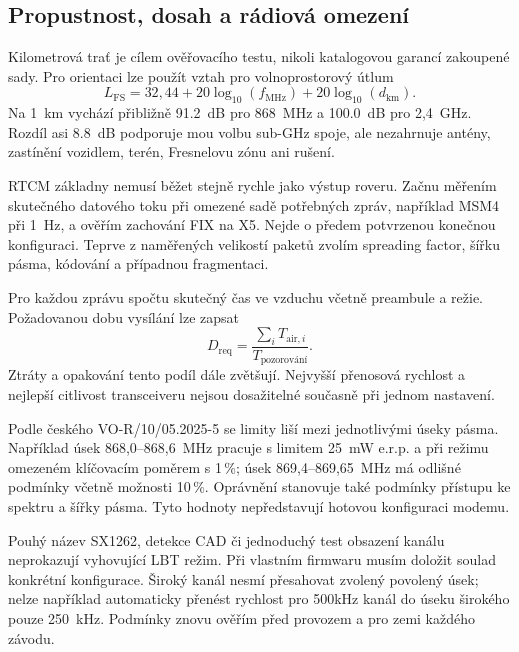 \subsection{Propustnost, dosah a rádiová omezení}

Kilometrová trať je cílem ověřovacího testu, nikoli katalogovou garancí
zakoupené sady. Pro orientaci lze použít vztah pro volnoprostorový útlum
\begin{equation}
 L_\mathrm{FS}=32{,}44+
 20\log_{10}(f_\mathrm{MHz})+20\log_{10}(d_\mathrm{km}).
\end{equation}
Na \SI{1}{km} vychází přibližně \SI{91.2}{dB} pro 868~MHz a
\SI{100.0}{dB} pro 2,4~GHz. Rozdíl asi \SI{8.8}{dB} podporuje mou volbu
sub-GHz spoje, ale nezahrnuje antény, zastínění vozidlem, terén,
Fresnelovu zónu ani rušení.

RTCM základny nemusí běžet stejně rychle jako výstup roveru. Začnu
měřením skutečného datového toku při omezené sadě potřebných zpráv, například
MSM4 při \SI{1}{Hz}, a ověřím zachování FIX na X5. Nejde o předem potvrzenou
konečnou konfiguraci. Teprve z naměřených velikostí paketů zvolím spreading
factor, šířku pásma, kódování a případnou fragmentaci.

Pro každou zprávu spočtu skutečný čas ve vzduchu včetně preambule a režie.
Požadovanou dobu vysílání lze zapsat
\begin{equation}
 D_\mathrm{req}=\frac{\sum_i T_{\mathrm{air},i}}{T_\mathrm{pozorování}}.
\end{equation}
Ztráty a opakování tento podíl dále zvětšují. Nejvyšší přenosová rychlost
a nejlepší citlivost transceiveru nejsou dosažitelné současně při jednom
nastavení.\cite{sx1262}

Podle českého VO-R/10/05.2025-5 se limity liší mezi jednotlivými úseky
pásma. Například úsek 868,0--868,6~MHz pracuje s limitem 25~mW e.r.p.
a při režimu omezeném klíčovacím poměrem s 1\,\%; úsek 869,4--869,65~MHz
má odlišné podmínky včetně možnosti 10\,\%. Oprávnění stanovuje také
podmínky přístupu ke spektru a šířky pásma.\cite{ctu-vor10}
Tyto hodnoty nepředstavují hotovou konfiguraci modemu.

Pouhý název SX1262, detekce CAD či jednoduchý test obsazení kanálu
neprokazují vyhovující LBT režim. Při vlastním firmwaru musím doložit soulad
konkrétní konfigurace. Široký kanál nesmí přesahovat zvolený povolený
úsek; nelze například automaticky přenést rychlost pro 500kHz kanál do
úseku širokého pouze 250~kHz. Podmínky znovu ověřím před provozem a pro zemi
každého závodu.

